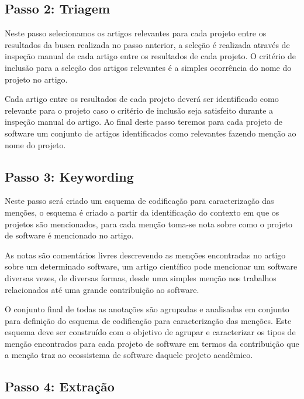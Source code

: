 \subsection{Passo 2: Triagem}

Neste passo selecionamos os artigos relevantes para cada projeto entre os
resultados da busca realizada no passo anterior, a seleção é realizada através
de inspeção manual de cada artigo entre os resultados de cada projeto. O
critério de inclusão para a seleção dos artigos relevantes é a simples
ocorrência do nome do projeto no artigo.

Cada artigo entre os resultados de cada projeto deverá ser identificado como
relevante para o projeto caso o critério de inclusão seja satisfeito durante a
inspeção manual do artigo. Ao final deste passo teremos para cada projeto
de software um conjunto de artigos identificados como relevantes fazendo
menção ao nome do projeto.

\subsection{Passo 3: Keywording}

Neste passo será criado um esquema de codificação para caracterização das
menções, o esquema é criado a partir da identificação do contexto em que os
projetos são mencionados, para cada menção toma-se nota sobre como o projeto de
software é mencionado no artigo.

As notas são comentários livres descrevendo as menções encontradas no artigo
sobre um determinado software, um artigo científico pode mencionar um software
diversas vezes, de diversas formas, desde uma simples menção nos trabalhos
relacionados até uma grande contribuição ao software.

O conjunto final de todas as anotações são agrupadas e analisadas em conjunto
para definição do esquema de codificação para caracterização das menções. Este
esquema deve ser construído com o objetivo de agrupar e caracterizar os tipos
de menção encontrados para cada projeto de software em termos da contribuição
que a menção traz ao ecossistema de software daquele projeto acadêmico.


\subsection{Passo 4: Extração}

